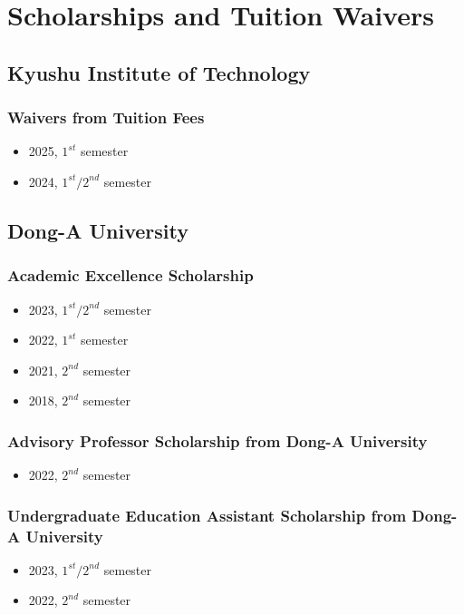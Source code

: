 \documentclass[a4paper,9pt]{extarticle}
\begin{document}
\section*{Scholarships and Tuition Waivers}
\subsection*{Kyushu Institute of Technology} 
\subsubsection*{Waivers from Tuition Fees}
\begin{itemize}
    \item 2025, $1^{st}$ semester 
    \item 2024, $1^{st} / 2^{nd}$ semester 
\end{itemize} 

\subsection*{Dong-A University} 
\subsubsection*{Academic Excellence Scholarship}
\begin{itemize}
    \item 2023, $1^{st} / 2^{nd}$ semester 
    \item 2022, $1^{st}$ semester 
    \item 2021, $2^{nd}$ semester 
    \item 2018, $2^{nd}$ semester 
\end{itemize} 
\subsubsection*{Advisory Professor Scholarship from Dong-A University}
\begin{itemize}
    \item 2022, $2^{nd}$ semester 
\end{itemize} 
\subsubsection*{Undergraduate Education Assistant Scholarship from Dong-A University}
\begin{itemize}
    \item 2023, $1^{st}/2^{nd}$ semester 
    \item 2022, $2^{nd}$ semester 
\end{itemize} 
\end{document}
